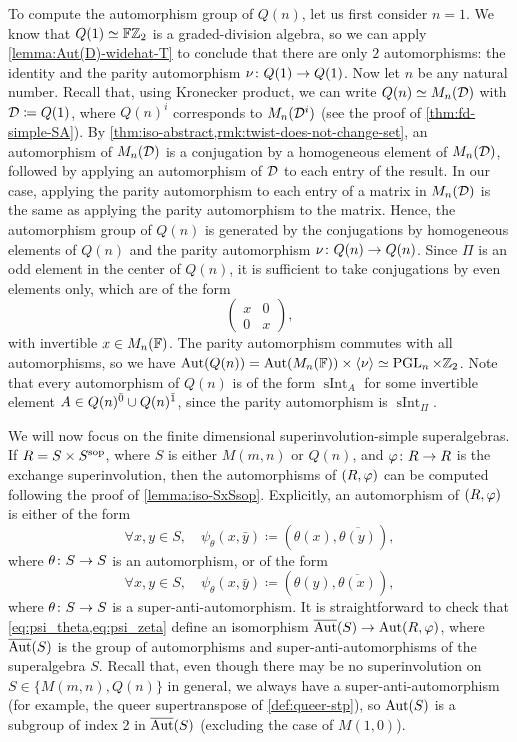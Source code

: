 To compute the automorphism group of $Q(n)$, let us first consider $n = 1$. 
We know that $Q(1) \simeq \mathbb{F}\mathbb{Z}_2$ is a graded-division algebra, so we can apply \cref{lemma:Aut(D)-widehat-T} to conclude that there are only $2$ automorphisms: the identity and the parity automorphism $\nu\colon Q(1) \to Q(1)$. 
Now let $n$ be any natural number. 
Recall that, using Kronecker product, we can write $Q(n) \simeq M_n(\mathcal{D})$ with $\mathcal{D} \coloneqq Q(1)$, where $Q(n)^i$ corresponds to $M_n(\mathcal{D}^i)$ (see the proof of \cref{thm:fd-simple-SA}). 
By \cref{thm:iso-abstract,rmk:twist-does-not-change-set}, an automorphism of $M_n(\mathcal{D})$ is a conjugation by a homogeneous element of $M_n(\mathcal{D})$, followed by applying an automorphism of $\mathcal{D}$ to each entry of the result. 
In our case, applying the parity automorphism to each entry of a matrix in $M_n(\mathcal{D})$ is the same as applying the parity automorphism to the matrix. 
Hence, the automorphism group of $Q(n)$ is generated by the conjugations by homogeneous elements of $Q(n)$ and the parity automorphism $\nu\colon Q(n) \to Q(n)$. 
Since $\Pi$ is an odd element in the center of $Q(n)$, it is sufficient to take conjugations by even elements only, which are of the form
\[
\begin{pmatrix}
    x & 0\\
    0 & x
\end{pmatrix},
\]
with invertible $x \in M_{n}(\mathbb{F})$. 
The parity automorphism commutes with all automorphisms, so we have $\operatorname{Aut}(Q(n)) = \operatorname{Aut}(M_n(\mathbb{F})) \times \langle \nu \rangle \simeq \operatorname{PGL}_n \times \mathbb{Z}_2$. 
Note that every automorphism of $Q(n)$ is of the form $\operatorname{sInt}_A$ for some invertible element $A \in Q(n)^{\bar0} \cup Q(n)^{\bar1}$, since the parity automorphism is $\operatorname{sInt}_\Pi$. 

We will now focus on the finite dimensional superinvolution-simple superalgebras. 
If $R = S\times S^{\mathrm{sop}}$, where $S$ is either $M(m,n)$ or $Q(n)$, and $\varphi\colon R \to R$ is the exchange superinvolution, then the automorphisms of $(R, \varphi)$ can be computed following the proof of \cref{lemma:iso-SxSsop}. 
Explicitly, an automorphism of $(R, \varphi)$ is either of the form
\[\label{eq:psi_theta}
    \forall x,y \in S, \quad \psi_\theta (x, \bar {y}) \coloneqq (\theta(x), \overline{\theta(y)}),
\]
where $\theta\colon S \to S$ is an automorphism, or of the form
\[\label{eq:psi_zeta}
    \forall x,y \in S, \quad \psi_\theta (x, \bar {y}) \coloneqq (\theta(y), \overline{\theta(x)}),
\]
where $\theta\colon S \to S$ is a super-anti-automorphism. 
It is straightforward to check that \cref{eq:psi_theta,eq:psi_zeta} define an isomorphism $\overline{\operatorname{Aut}}(S) \to \operatorname{Aut}(R, \varphi)$, where $\overline{\operatorname{Aut}}(S)$ is the group of automorphisms and super-anti-automorphisms of the superalgebra $S$. 
Recall that, even though there may be no superinvolution on $S \in \{ M(m,n), Q(n) \}$ in general, we always have a super-anti-automorphism (for example, the queer supertranspose of  \cref{def:queer-stp}), so $\operatorname{Aut} (S)$ is a subgroup of index 2 in $\overline{\operatorname{Aut}}(S)$ (excluding the case of $M(1,0)$).



